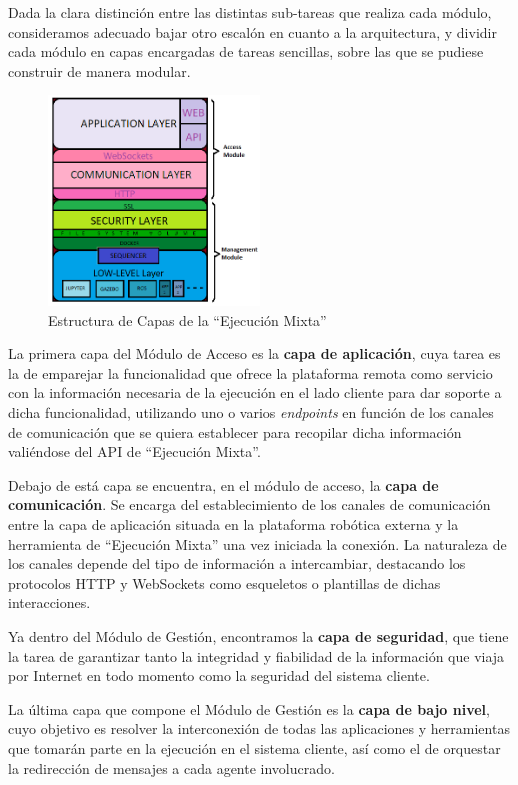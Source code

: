 Dada la clara distinción entre las distintas sub-tareas que realiza cada módulo, consideramos adecuado bajar otro escalón en cuanto a la arquitectura, y dividir cada módulo en capas encargadas de tareas sencillas, sobre las que se pudiese construir de manera modular.

\begin{figure}[!hbtp]  \centering\noindent
    \includegraphics[width=0.5\textwidth]{figures/layer_structure.png}
    \caption{Estructura de Capas de la ``Ejecución Mixta''}
    \label{ly_struct}
\end{figure}

La primera capa del Módulo de Acceso es la \textbf{capa de aplicación}, cuya tarea es la de emparejar la funcionalidad que ofrece la plataforma remota como servicio con la información necesaria de la ejecución en el lado cliente para dar soporte a dicha funcionalidad, utilizando uno o varios \textit{endpoints} en función de los canales de comunicación que se quiera establecer para recopilar dicha información valiéndose del API de ``Ejecución Mixta''.

Debajo de está capa se encuentra, en el módulo de acceso, la \textbf{capa de comunicación}. Se encarga del establecimiento de los canales de comunicación entre la capa de aplicación situada en la plataforma robótica externa y la herramienta de ``Ejecución Mixta'' una vez iniciada la conexión. La naturaleza de los canales depende del tipo de información a intercambiar, destacando los protocolos HTTP y WebSockets como esqueletos o plantillas de dichas interacciones.

Ya dentro del Módulo de Gestión, encontramos la \textbf{capa de seguridad}, que tiene la tarea de garantizar tanto la integridad y fiabilidad de la información que viaja por Internet en todo momento como la seguridad del sistema cliente.

La última capa que compone el Módulo de Gestión es la \textbf{capa de bajo nivel}, cuyo objetivo es resolver la interconexión de todas las aplicaciones y herramientas que tomarán parte en la ejecución en el sistema cliente, así como el de orquestar la redirección de mensajes a cada agente involucrado.

